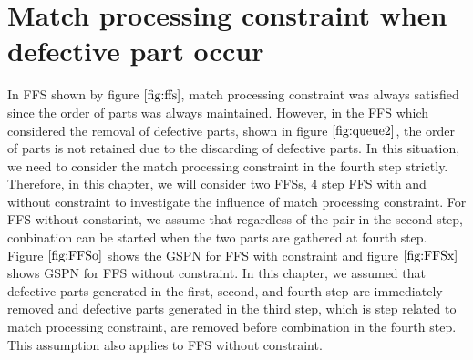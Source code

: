 
\section{Match processing constraint when defective part occur \label{sec:matching}}
In FFS shown by figure $\ref{fig:ffs}$, match processing constraint was always satisfied since the order of parts was always maintained.
However, in the FFS which considered the removal of defective parts, shown in figure $\ref{fig:queue2}$, the order of parts is not retained due to the discarding of defective parts. 
In this situation, we need to consider the match processing constraint in the fourth step strictly.
Therefore, in this chapter, we will consider two FFSs, 4 step FFS with and without constraint to investigate the influence of match processing constraint.
For FFS without constarint, we assume that regardless of the pair in the second step, conbination can be started when the two parts are gathered at fourth step.
Figure $\ref{fig:FFSo}$ shows the GSPN for FFS with constraint and figure $\ref{fig:FFSx}$ shows GSPN for FFS without constraint.
In this chapter, we assumed that defective parts generated in the first, second, and fourth step are immediately removed and defective parts generated in the third step, which is step related to match processing constraint, are removed before combination in the fourth step.
This assumption also applies to FFS without constraint.


